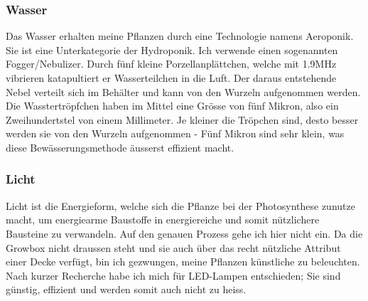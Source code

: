 \documentclass[12pt,titlepage,a4paper]{article}
\begin{document}
\subsubsection{Wasser} 
Das Wasser erhalten meine Pflanzen durch eine Technologie namens Aeroponik. Sie ist eine Unterkategorie der Hydroponik. Ich verwende einen sogenannten Fogger/Nebulizer. Durch fünf kleine Porzellanplättchen, welche mit 1.9MHz vibrieren katapultiert er Wasserteilchen in die Luft. Der daraus entstehende Nebel verteilt sich im Behälter und kann von den Wurzeln aufgenommen werden. Die Wasstertröpfchen haben im Mittel eine Grösse von fünf Mikron, also ein Zweihundertstel von einem Millimeter. Je kleiner die Tröpchen sind, desto besser werden sie von den Wurzeln aufgenommen - Fünf Mikron sind sehr klein, was diese Bewässerungsmethode äusserst effizient macht. 


\subsubsection{Licht}
Licht ist die Energieform, welche sich die Pflanze bei der Photosynthese zunutze macht, um energiearme Baustoffe in energiereiche und somit nützlichere Bausteine zu verwandeln. Auf den genauen Prozess gehe ich hier nicht ein. Da die Growbox nicht draussen steht und sie auch über das recht nützliche Attribut einer Decke verfügt, bin ich gezwungen, meine Pflanzen künstliche zu beleuchten. Nach kurzer Recherche habe ich mich für LED-Lampen entschieden; Sie sind günstig, effizient und werden somit auch nicht zu heiss.\\



%

\end{document}
